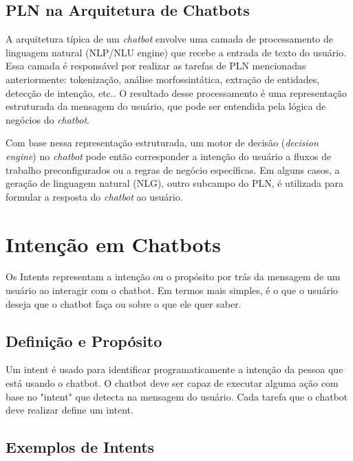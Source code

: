 \documentclass[14pt,a4paper,oneside]{book}
\begin{document}
\section{PLN na Arquitetura de Chatbots}

A arquitetura típica de um \textit{chatbot} envolve uma camada de processamento de linguagem natural (NLP/NLU engine) que recebe a entrada de texto do usuário. Essa camada é responsável por realizar as tarefas de PLN mencionadas anteriormente: tokenização, análise morfossintática, extração de entidades, detecção de intenção, etc.. O resultado desse processamento é uma representação estruturada da mensagem do usuário, que pode ser entendida pela lógica de negócios do \textit{chatbot}.

Com base nessa representação estruturada, um motor de decisão (\textit{decision engine}) no \textit{chatbot} pode então corresponder a intenção do usuário a fluxos de trabalho preconfigurados ou a regras de negócio específicas. Em alguns casos, a geração de linguagem natural (NLG), outro subcampo do PLN, é utilizada para formular a resposta do \textit{chatbot} ao usuário.


\chapter{Intenção em Chatbots}
\label{chap:intents}

Os Intents representam a intenção ou o propósito por trás da mensagem de um usuário ao interagir com o chatbot. Em termos mais simples, é o que o usuário deseja que o chatbot faça ou sobre o que ele quer saber.

\section{Definição e Propósito}
\label{sec:intents_definicao}

Um intent é usado para identificar programaticamente a intenção da pessoa que está usando o chatbot. O chatbot deve ser capaz de executar alguma ação com base no "intent" que detecta na mensagem do usuário. Cada tarefa que o chatbot deve realizar define um intent.

\section{Exemplos de Intents}
\label{sec:intents_exemplos}
\end{document}
